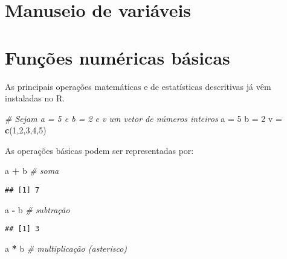 \documentclass[
]{book}
\newenvironment{Shaded}{\begin{snugshade}}{\end{snugshade}}
\newcommand{\CommentTok}[1]{\textcolor[rgb]{0.56,0.35,0.01}{\textit{#1}}}
\newcommand{\DecValTok}[1]{\textcolor[rgb]{0.00,0.00,0.81}{#1}}
\newcommand{\KeywordTok}[1]{\textcolor[rgb]{0.13,0.29,0.53}{\textbf{#1}}}
\newcommand{\NormalTok}[1]{#1}
\newcommand{\OperatorTok}[1]{\textcolor[rgb]{0.81,0.36,0.00}{\textbf{#1}}}
\newcommand{\StringTok}[1]{\textcolor[rgb]{0.31,0.60,0.02}{#1}}
\begin{document}
\hypertarget{manuseio-de-variuxe1veis-1}{%
\section{Manuseio de variáveis}\label{manuseio-de-variuxe1veis-1}}

\hypertarget{funuxe7uxf5es-numuxe9ricas-buxe1sicas-1}{%
\section{Funções numéricas básicas}\label{funuxe7uxf5es-numuxe9ricas-buxe1sicas-1}}

As principais operações matemáticas e de estatísticas descritivas já vêm instaladas no R.

\begin{Shaded}
\begin{Highlighting}[]
\CommentTok{# Sejam a = 5 e b = 2 e v um vetor de números inteiros}
\NormalTok{a =}\StringTok{ }\DecValTok{5}
\NormalTok{b =}\StringTok{ }\DecValTok{2}
\NormalTok{v =}\StringTok{ }\KeywordTok{c}\NormalTok{(}\DecValTok{1}\NormalTok{,}\DecValTok{2}\NormalTok{,}\DecValTok{3}\NormalTok{,}\DecValTok{4}\NormalTok{,}\DecValTok{5}\NormalTok{)}
\end{Highlighting}
\end{Shaded}

As operações básicas podem ser representadas por:

\begin{Shaded}
\begin{Highlighting}[]
\NormalTok{a }\OperatorTok{+}\StringTok{ }\NormalTok{b }\CommentTok{# soma}
\end{Highlighting}
\end{Shaded}

\begin{verbatim}
## [1] 7
\end{verbatim}

\begin{Shaded}
\begin{Highlighting}[]
\NormalTok{a }\OperatorTok{-}\StringTok{ }\NormalTok{b }\CommentTok{# subtração}
\end{Highlighting}
\end{Shaded}

\begin{verbatim}
## [1] 3
\end{verbatim}

\begin{Shaded}
\begin{Highlighting}[]
\NormalTok{a }\OperatorTok{*}\StringTok{ }\NormalTok{b }\CommentTok{# multiplicação (asterisco)}
\end{Highlighting}
\end{Shaded}
\end{document}
